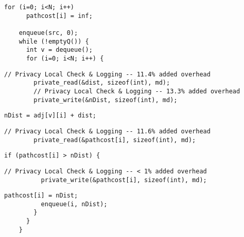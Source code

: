   \begin{lstlisting}[morekeywords={pathcost},aboveskip=0pt, belowskip=0pt, firstnumber=auto,name=dij_checks]
    for (i=0; i<N; i++)
      pathcost[i] = inf;

    enqueue(src, 0);
    while (!emptyQ()) {
      int v = dequeue();
      for (i=0; i<N; i++) {
  \end{lstlisting}

  \begin{lstlisting}[morekeywords={pathcost,dist,nDist}, aboveskip=0pt,belowskip=0pt,backgroundcolor=\color{lightgray},
  firstnumber=auto, name=dij_checks]
        // Privacy Local Check & Logging -- 11.4% added overhead
        private_read(&dist, sizeof(int), md);
        // Privacy Local Check & Logging -- 13.3% added overhead
        private_write(&nDist, sizeof(int), md);
  \end{lstlisting}

  \begin{lstlisting}[morekeywords={pathcost,dist,nDist}, aboveskip=0pt, belowskip=0pt, firstnumber=auto,name=dij_checks]
        nDist = adj[v][i] + dist;
  \end{lstlisting}

  \begin{lstlisting}[morekeywords={pathcost}, aboveskip=0pt,belowskip=0pt,backgroundcolor=\color{lightgray},
  firstnumber=auto, name=dij_checks]
        // Privacy Local Check & Logging -- 11.6% added overhead
        private_read(&pathcost[i], sizeof(int), md);
  \end{lstlisting}


  \begin{lstlisting}[morekeywords={pathcost}, aboveskip=0pt, belowskip=0pt, firstnumber=auto,name=dij_checks]
        if (pathcost[i] > nDist) {
  \end{lstlisting}

  \begin{lstlisting}[morekeywords={pathcost}, aboveskip=0pt,belowskip=0pt,backgroundcolor=\color{lightgray},
  firstnumber=auto, name=dij_checks]
          // Privacy Local Check & Logging -- < 1% added overhead
          private_write(&pathcost[i], sizeof(int), md);
  \end{lstlisting}

  \begin{lstlisting}[morekeywords={pathcost}, aboveskip=0pt, belowskip=0pt, firstnumber=auto,name=dij_checks]
          pathcost[i] = nDist;
          enqueue(i, nDist);
        }
      }
    }
    \end{lstlisting}

